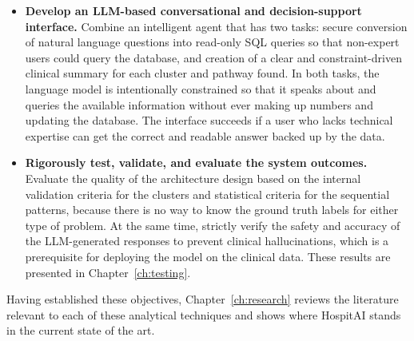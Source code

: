 \begin{itemize}
    \item[\textbf{V.}] \textbf{Develop an LLM-based conversational and decision-support interface.} Combine an intelligent agent that has two tasks: secure conversion of natural language questions into read-only SQL queries so that non-expert users could query the database, and creation of a clear and constraint-driven clinical summary for each cluster and pathway found. In both tasks, the language model is intentionally constrained so that it speaks about and queries the available information without ever making up numbers and updating the database. The interface succeeds if a user who lacks technical expertise can get the correct and readable answer backed up by the data.

    \item[\textbf{VI.}] \textbf{Rigorously test, validate, and evaluate the system outcomes.} Evaluate the quality of the architecture design based on the internal validation criteria for the clusters and statistical criteria for the sequential patterns, because there is no way to know the ground truth labels for either type of problem. At the same time, strictly verify the safety and accuracy of the LLM-generated responses to prevent clinical hallucinations, which is a prerequisite for deploying the model on the clinical data. These results are presented in Chapter~\ref{ch:testing}.
\end{itemize}

\vspace{0.5cm}

Having established these objectives, Chapter~\ref{ch:research} reviews the literature relevant to each of these analytical techniques and shows where HospitAI stands in the current state of the art.

